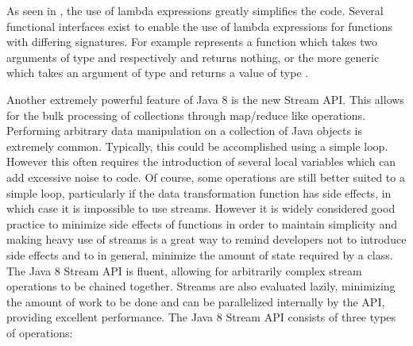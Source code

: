 

As seen in , the use of lambda expressions greatly simplifies the code. Several functional interfaces exist to enable the use of lambda expressions for functions with differing signatures. For example  represents a function which takes two arguments of type  and  respectively and returns nothing, or the more generic  which takes an argument of type  and returns a value of type .

Another extremely powerful feature of Java 8 is the new Stream API. This allows for the bulk processing of collections through map/reduce like operations. Performing arbitrary data manipulation on a collection of Java objects is extremely common. Typically, this could be accomplished using a simple loop. However this often requires the introduction of several local variables which can add excessive noise to code. Of course, some operations are still better suited to a simple loop, particularly if the data transformation function has side effects, in which case it is impossible to use streams. However it is widely considered good practice to minimize side effects of functions in order to maintain simplicity and making heavy use of streams is a great way to remind developers not to introduce side effects and to in general, minimize the amount of state required by a class. The Java 8 Stream API is fluent, allowing for arbitrarily complex stream operations to be chained together. Streams are also evaluated lazily, minimizing the amount of work to be done and can be parallelized internally by the API, providing excellent performance. The Java 8 Stream API consists of three types of operations: 

